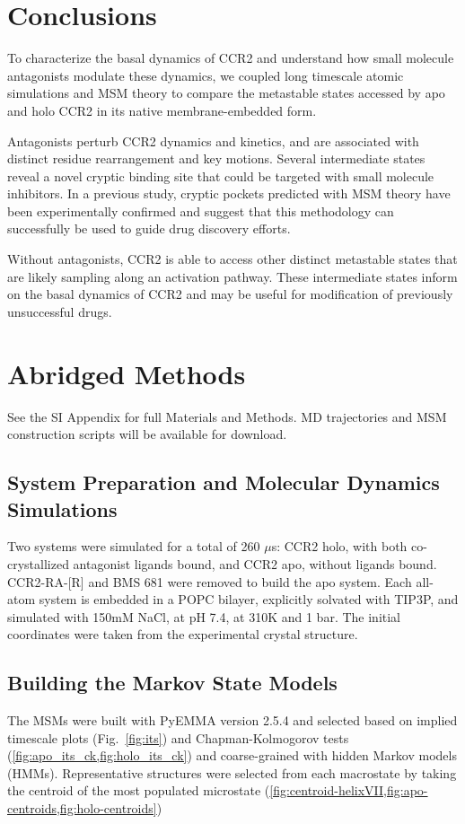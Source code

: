 \section{Conclusions}

To characterize the basal dynamics of CCR2 and understand how small molecule antagonists modulate these dynamics, we coupled long timescale atomic simulations and MSM theory to compare the metastable states accessed by apo and holo CCR2 in its native membrane-embedded form.

Antagonists perturb CCR2 dynamics and kinetics, and are associated with distinct residue rearrangement and key motions.
Several intermediate states reveal a novel cryptic binding site that could be targeted with small molecule inhibitors.
In a previous study\cite{Bowman2015}, cryptic pockets predicted with MSM theory have been experimentally confirmed and suggest that this methodology can successfully be used to guide drug discovery efforts.

Without antagonists, CCR2 is able to access other distinct metastable states that are likely sampling along an activation pathway.
These intermediate states inform on the basal dynamics of CCR2 and may be useful for modification of previously unsuccessful drugs.


\section{Abridged Methods}
See the SI Appendix for full Materials and Methods.
MD trajectories and MSM construction scripts will be available for download.

\subsection{\textbf{System Preparation and Molecular Dynamics Simulations}}
Two systems were simulated for a total of 260 $\mu$s: CCR2 holo, with both co-crystallized antagonist ligands bound, and CCR2 apo, without ligands bound. CCR2-RA-[R] and BMS 681\cite{Zheng2016} were removed to build the apo system. Each all-atom system is embedded in a POPC bilayer, explicitly solvated with TIP3P, and simulated with 150mM NaCl, at pH 7.4, at 310K and 1 bar. The initial coordinates were taken from the experimental crystal structure\cite{Zheng2016}.

\subsection{\textbf{Building the Markov State Models}}
The MSMs were built with PyEMMA version 2.5.4 \cite{Scherer2015} and selected based on implied timescale plots (Fig.~\ref{fig:its}) and Chapman-Kolmogorov tests (\cref{fig:apo_its_ck,fig:holo_its_ck}) and coarse-grained with hidden Markov models (HMMs).
Representative structures were selected from each macrostate by taking the centroid of the most populated microstate (\cref{fig:centroid-helixVII,fig:apo-centroids,fig:holo-centroids})


